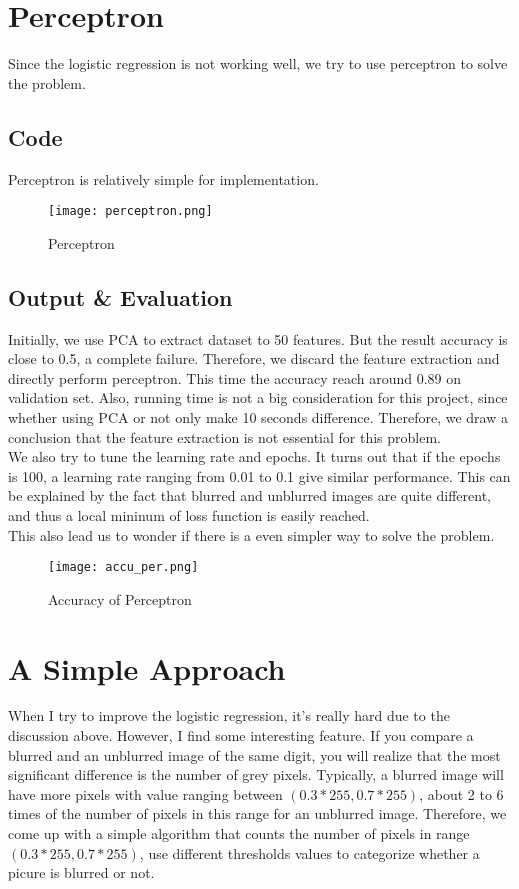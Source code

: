 \documentclass[conference]{IEEEtran}
\begin{document}
\section{Perceptron}
Since the logistic regression is not working well, we try to use perceptron to solve the problem. 
\subsection{Code}
Perceptron is relatively simple for implementation.
\begin{figure}
    \centering
    \texttt{[image: perceptron.png]}
    \caption{Perceptron}
    \label{fig9:Perceptron}
    \end{figure}
\subsection{Output \& Evaluation}
Initially, we use PCA to extract dataset to 50 features. But the result accuracy is close to 0.5, a complete failure. Therefore, we 
discard the feature extraction and directly perform perceptron. This time the accuracy reach around 0.89 on validation set. Also, running
time is not a big consideration for this project, since whether using PCA or not only make 10 seconds difference. Therefore, we draw a conclusion
that the feature extraction is not essential for this problem. \\
We also try to tune the learning rate and epochs. It turns out that if the epochs is 100, a learning rate ranging from 0.01 to 0.1 give similar performance.
This can be explained by the fact that blurred and unblurred images are quite different, and thus a local mininum of loss function is easily reached.\\
This also lead us to wonder if there is a even simpler way to solve the problem.
\begin{figure}
    \centering
    \texttt{[image: accu\_per.png]}
    \caption{Accuracy of Perceptron}
    \label{fig10:Accuracy of Perceptron}
    \end{figure}

\section{A Simple Approach}
When I try to improve the logistic regression, it's really hard due to the discussion above. However, I find some interesting
feature. If you compare a blurred and an unblurred image of the same digit, you will realize that the most significant difference
is the number of grey pixels. Typically, a blurred image will have more pixels with value ranging between $(0.3 * 255, 0.7 * 255)$, about 
2 to 6 times of the number of pixels in this range for an unblurred image. Therefore, we come up with a simple algorithm that counts the number of
pixels in range $(0.3 * 255, 0.7 * 255)$, use different thresholds values to categorize whether a picure is blurred or not.
\end{document}
